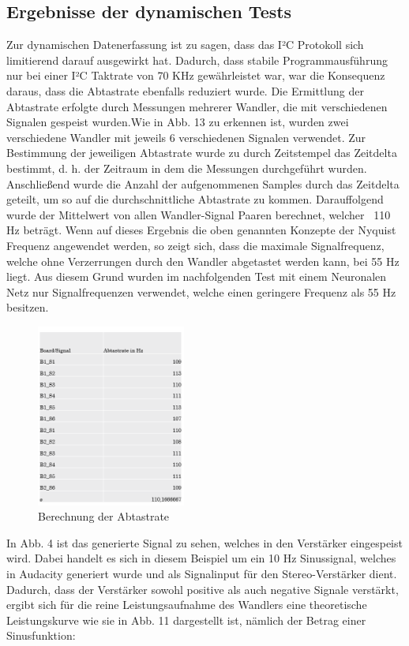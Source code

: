 \begin{flushleft}



\subsection{Ergebnisse der dynamischen Tests}
Zur dynamischen Datenerfassung ist zu sagen, dass das I²C Protokoll sich limitierend darauf ausgewirkt hat. Dadurch, dass stabile Programmausführung nur bei einer I²C Taktrate von 70 KHz gewährleistet war, war die Konsequenz daraus, dass die Abtastrate ebenfalls reduziert wurde. Die Ermittlung der Abtastrate erfolgte durch Messungen mehrerer Wandler, die mit verschiedenen Signalen gespeist wurden.Wie in Abb. 13 zu erkennen ist, wurden zwei verschiedene Wandler mit jeweils 6 verschiedenen Signalen verwendet. Zur Bestimmung der jeweiligen Abtastrate wurde zu durch Zeitstempel das Zeitdelta bestimmt, d. h. der Zeitraum in dem die Messungen durchgeführt wurden. Anschließend wurde die Anzahl der aufgenommenen Samples durch das Zeitdelta geteilt, um so auf die durchschnittliche Abtastrate zu kommen. Darauffolgend wurde der Mittelwert von allen Wandler-Signal Paaren berechnet, welcher ~110 Hz beträgt. Wenn auf dieses Ergebnis die oben genannten Konzepte der Nyquist Frequenz angewendet werden, so zeigt sich, dass die maximale Signalfrequenz, welche ohne Verzerrungen durch den Wandler abgetastet werden kann, bei 55 Hz liegt. Aus diesem Grund wurden im nachfolgenden Test mit einem Neuronalen Netz nur Signalfrequenzen verwendet, welche einen geringere Frequenz als 55 Hz besitzen. 

\begin{figure}[H]
    \centering
 \includegraphics[height= 6cm, width =4 cm]{Pictures/Speed.png}
    \caption{Berechnung der Abtastrate}
\end{figure}


In Abb. 4 ist das generierte Signal zu sehen, welches in den Verstärker eingespeist wird. Dabei handelt es sich in diesem Beispiel um ein 10 Hz Sinussignal, welches in Audacity generiert wurde und als Signalinput für den Stereo-Verstärker dient. Dadurch, dass der Verstärker sowohl positive als auch negative Signale verstärkt, ergibt sich für die reine Leistungsaufnahme des Wandlers eine theoretische Leistungskurve wie sie in Abb. 11 dargestellt ist, nämlich  der Betrag einer Sinusfunktion:


\end{flushleft}
